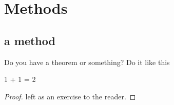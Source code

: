 \chapter{Methods}\label{ch:methods}

\section{a method}\label{sec:a-method}
Do you have a theorem or something? Do it like this

\begin{theorem}
  1 + 1 = 2
\end{theorem}
\begin{proof}
  left as an exercise to the reader.
\end{proof}